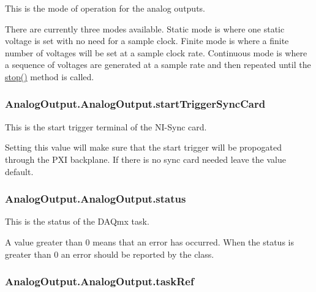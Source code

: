 This is the mode of operation for the analog outputs. 

There are currently three modes available. Static mode is where one static voltage is set with no need for a sample clock. Finite mode is where a finite number of voltages will be set at a sample clock rate. Continuous mode is where a sequence of voltages are generated at a sample rate and then repeated until the \hyperlink{class_analog_output_1_1_analog_output_ae8b99d08fc29d3ff472824430ebd4067}{stop()} method is called. \hypertarget{class_analog_output_1_1_analog_output_a7f2d56d4169a65eb67d1f5d3f2c5c87a}{
\subsubsection[{start\-Trigger\-Sync\-Card}]{\setlength{\rightskip}{0pt plus 5cm}Analog\-Output.\-Analog\-Output.\-start\-Trigger\-Sync\-Card}}\label{class_analog_output_1_1_analog_output_a7f2d56d4169a65eb67d1f5d3f2c5c87a}


This is the start trigger terminal of the N\-I-\/\-Sync card. 

Setting this value will make sure that the start trigger will be propogated through the P\-X\-I backplane. If there is no sync card needed leave the value default. \hypertarget{class_analog_output_1_1_analog_output_a021dd1434ccfaaa5a876ebde88609cb1}{
\subsubsection[{status}]{\setlength{\rightskip}{0pt plus 5cm}Analog\-Output.\-Analog\-Output.\-status}}\label{class_analog_output_1_1_analog_output_a021dd1434ccfaaa5a876ebde88609cb1}


This is the status of the D\-A\-Qmx task. 

A value greater than 0 means that an error has occurred. When the status is greater than 0 an error should be reported by the class. \hypertarget{class_analog_output_1_1_analog_output_a9244a764a26db3ca994e95f2e64f650f}{
\subsubsection[{task\-Ref}]{\setlength{\rightskip}{0pt plus 5cm}Analog\-Output.\-Analog\-Output.\-task\-Ref}}\label{class_analog_output_1_1_analog_output_a9244a764a26db3ca994e95f2e64f650f}


